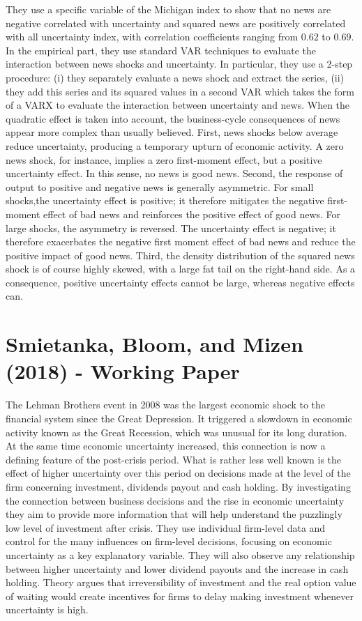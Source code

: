 \documentclass{article}
\begin{document}
{They use a specific variable of the Michigan index to show that no news are negative correlated with uncertainty and squared news are positively correlated with all uncertainty index, with correlation coefficients ranging from $0.62$ to $0.69$. In the empirical part, they use standard VAR techniques to evaluate the interaction between news shocks and uncertainty. In particular, they use a 2-step procedure: (i) they separately evaluate a news shock and extract the series, (ii) they add this series and its squared values in a second VAR which takes the form of a VARX to evaluate the interaction between uncertainty and news. When the quadratic effect is taken into account, the business-cycle consequences of news appear more complex than usually believed. First, news shocks below average reduce uncertainty, producing a temporary upturn of economic activity. A zero news shock, for instance, implies a zero first-moment effect, but a positive uncertainty effect. In this sense, no news is good news. Second, the response of output to positive and negative news is generally asymmetric. For small shocks,the uncertainty effect is positive; it therefore mitigates the negative first-moment effect of bad news and reinforces the positive effect of good news. For large shocks, the asymmetry is reversed. The uncertainty effect is negative; it therefore exacerbates the negative first moment effect of bad news and reduce the positive impact of good news. Third, the density distribution of the squared news shock is of course highly skewed, with a large fat tail on the right-hand side. As a consequence, positive uncertainty effects cannot be large, whereas negative effects can.

\section*{Smietanka, Bloom, and Mizen (2018) - Working Paper}

The Lehman Brothers event in 2008 was the largest economic shock to the financial system since the Great Depression. It triggered a slowdown in economic activity known as the Great Recession, which was unusual for its long duration. At the same time economic uncertainty increased, this connection is now a defining feature of the post-crisis period. What is rather less well known is the effect of higher uncertainty over this period on decisions made at the level of the firm concerning investment, dividends payout and cash holding. By investigating the connection between business decisions and the rise in economic uncertainty they aim to provide more information that will help understand the puzzlingly low level of investment after crisis. They use individual firm-level data and control for the many influences on firm-level decisions, focusing on economic uncertainty as a key explanatory variable. They will also observe any relationship between higher uncertainty and lower dividend payouts and the increase in cash holding. Theory argues that irreversibility of investment and the real option value of waiting would create incentives for firms to delay making investment whenever uncertainty is high. 

}
\end{document}
